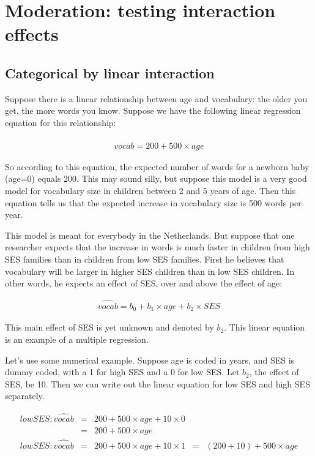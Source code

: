 
\chapter{Moderation: testing interaction effects}





\section{Categorical by linear interaction}

Suppose there is a linear relationship between age and vocabulary: the older you get, the more words you know. Suppose we have the following linear regression equation for this relationship:


\begin{eqnarray}
\widehat{vocab} = 200 + 500 \times age 
\end{eqnarray}

So according to this equation, the expected number of words for a newborn baby (age=0) equals 200. This may sound silly, but suppose this model is a very good model for vocabulary size in children between 2 and 5 years of age. Then this equation tells us that the expected increase in vocabulary size is 500 words per year.

This model is meant for everybody in the Netherlands. But suppose that one researcher expects that the increase in words is much faster in children from high SES families than in children from low SES families. First he believes that vocabulary will be larger in higher SES children than in low SES children. In other words, he expects an effect of SES, over and above the effect of age:

\begin{eqnarray}
\widehat{vocab} = b_0 + b_1 \times age + b_2 \times SES
\end{eqnarray}

This main effect of SES is yet unknown and denoted by $b_2$. This linear equation is an example of a multiple regression.


Let's use some numerical example. Suppose age is coded in years, and SES is dummy coded, with a 1 for high SES and a 0 for low SES. Let $b_2$, the effect of SES, be 10. Then we can write out the linear equation for low SES and high SES separately.


\begin{eqnarray}
low SES: \widehat{vocab} &=& 200 + 500 \times age + 10 \times 0  \\
&=& 200 + 500 \times age \\
low SES: \widehat{vocab} &=& 200 + 500 \times age + 10 \times 1  
&=& (200+10) + 500 \times age
\end{eqnarray}

